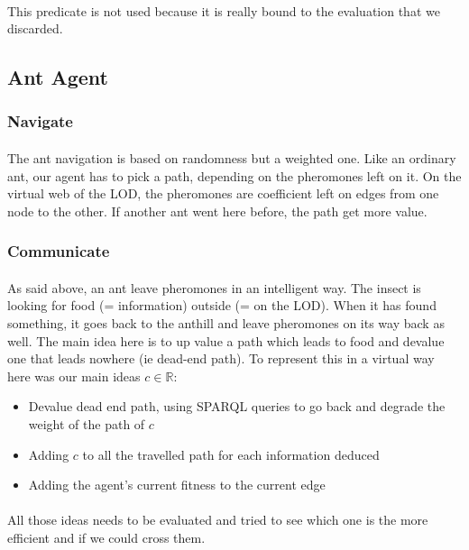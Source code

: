 \documentclass{article}
\newenvironment{itemh}[0]{\begin{itemize}[label=$\heartsuit$, font=\color{mygray} \small]}{\end{itemize}}
\begin{document}
			\paragraph{}
			This predicate is not used because it is really bound to the evaluation that we discarded.
	\subsection{Ant Agent}
		\subsubsection{Navigate}
			\paragraph{}
			The ant navigation is based on randomness but a weighted one.
			Like an ordinary ant, our agent has to pick a path, depending on the pheromones left on it.
			On the virtual web of the LOD, the pheromones are coefficient left on edges from one node to the other.
			If another ant went here before, the path get more value.			
		\subsubsection{Communicate}
			\paragraph{}
			As said above, an ant leave pheromones in an intelligent way.
			The insect is looking for food (= information) outside (= on the LOD).
			When it has found something, it goes back to the anthill and leave pheromones on its way back as well.
			The main idea here is to up value a path which leads to food and devalue one that leads nowhere (ie dead-end path).
			To represent this in a virtual way here was our main ideas $c \in \mathbb{R}$:
			\begin{itemh}
				\item Devalue dead end path, using SPARQL queries to go back and degrade the weight of the path of $c$
				\item Adding $c$ to all the travelled path for each information deduced
				\item Adding the agent's current fitness to the current edge
			\end{itemh}
			\paragraph{}
				All those ideas needs to be evaluated and tried to see which one is the more efficient and if we could cross them.
\end{document}
